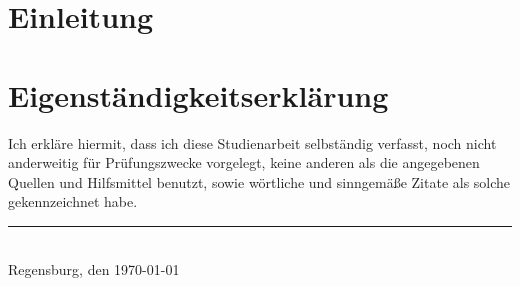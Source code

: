 \documentclass[
	a4paper, 
	11pt
	]{scrreprt}
\begin{document}

\maketitle


\listoffigures
\listoftables
\tableofcontents
\newpage



\chapter{Einleitung}
\blindtext
\blindtext
\blindtext
\blindtext
\blindtext
\blindtext


{\nocite{*}}


\chapter*{Eigenständigkeitserklärung}
Ich erkläre hiermit, dass ich diese Studienarbeit selbständig verfasst, noch nicht anderweitig für Prüfungszwecke vorgelegt, keine anderen als die angegebenen Quellen und Hilfsmittel benutzt, sowie wörtliche und sinngemäße Zitate als solche gekennzeichnet habe.
\vspace{15mm} \\
\rule{0.5\textwidth}{0.4pt} \\
\vspace{5mm}
Regensburg, den \today
\end{document}
